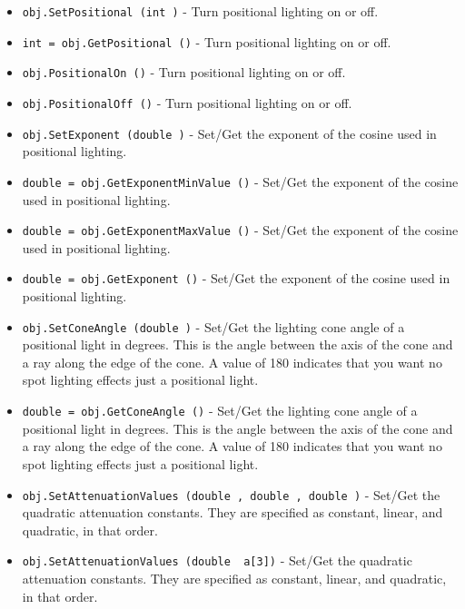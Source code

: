 \begin{itemize}
\item  \verb|obj.SetPositional (int )| -  Turn positional lighting on or off.

\item  \verb|int = obj.GetPositional ()| -  Turn positional lighting on or off.

\item  \verb|obj.PositionalOn ()| -  Turn positional lighting on or off.

\item  \verb|obj.PositionalOff ()| -  Turn positional lighting on or off.

\item  \verb|obj.SetExponent (double )| -  Set/Get the exponent of the cosine used in positional lighting.

\item  \verb|double = obj.GetExponentMinValue ()| -  Set/Get the exponent of the cosine used in positional lighting.

\item  \verb|double = obj.GetExponentMaxValue ()| -  Set/Get the exponent of the cosine used in positional lighting.

\item  \verb|double = obj.GetExponent ()| -  Set/Get the exponent of the cosine used in positional lighting.

\item  \verb|obj.SetConeAngle (double )| -  Set/Get the lighting cone angle of a positional light in degrees.
 This is the angle between the axis of the cone and a ray along the edge of
 the cone.
 A value of 180 indicates that you want no spot lighting effects
 just a positional light.

\item  \verb|double = obj.GetConeAngle ()| -  Set/Get the lighting cone angle of a positional light in degrees.
 This is the angle between the axis of the cone and a ray along the edge of
 the cone.
 A value of 180 indicates that you want no spot lighting effects
 just a positional light.

\item  \verb|obj.SetAttenuationValues (double , double , double )| -  Set/Get the quadratic attenuation constants. They are specified as
 constant, linear, and quadratic, in that order.

\item  \verb|obj.SetAttenuationValues (double  a[3])| -  Set/Get the quadratic attenuation constants. They are specified as
 constant, linear, and quadratic, in that order.


\end{itemize}
